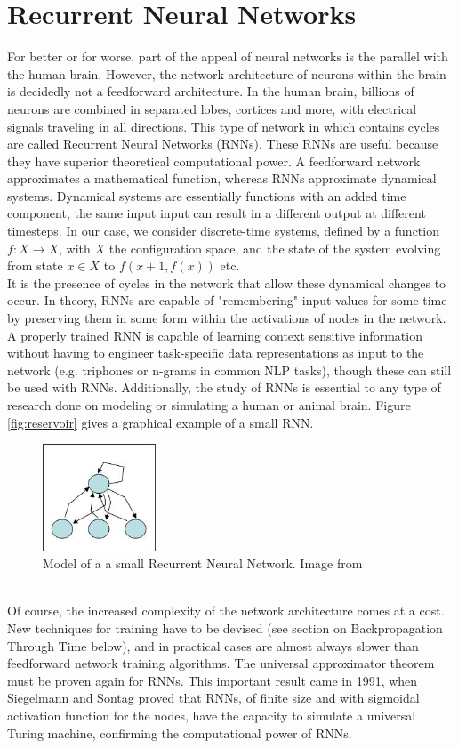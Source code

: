 \documentclass[12pt,oneside]{CUNY_CS_PhD}
\begin{document}
\section{Recurrent Neural Networks}
For better or for worse, part of the appeal of neural networks is the parallel with the human brain. However, the network architecture of neurons within the brain is decidedly not a feedforward architecture. In the human brain, billions of neurons are combined in separated lobes, cortices and more, with electrical signals traveling in all directions. This type of network in which contains cycles are called Recurrent Neural Networks (RNNs). These RNNs are useful because they have superior theoretical computational power. A feedforward network approximates a mathematical function, whereas RNNs approximate dynamical systems. Dynamical systems are essentially functions with an added time component, the same input input can result in a different output at different timesteps. In our case, we consider discrete-time systems, defined by a function $f: X \rightarrow X$, with $X$ the configuration space, and the state of the system evolving from state $x \in X$ to $f(x+1, f(x))$ etc. \\
It is the presence of cycles in the network that allow these dynamical changes to occur. In theory, RNNs are capable of "remembering" input values for some time by preserving them in some form within the activations of nodes in the network. A properly trained RNN is capable of learning context sensitive information without having to engineer task-specific data representations as input to the network (e.g. triphones or n-grams in common NLP tasks), though these can still be used with RNNs. Additionally, the study of RNNs is essential to any type of research done on modeling or simulating a human or animal brain. Figure \ref{fig:reservoir} gives a graphical example of a small RNN.
\begin{figure}[!htbp]
\centering
\includegraphics[width=0.3\textwidth]{pictures/rnn.png}
\caption{Model of a a small Recurrent Neural Network. Image from \cite{rnn} }
\label{fig:rnn}
\end{figure}\\
Of course, the increased complexity of the network architecture comes at a cost. New techniques for training have to be devised (see section on Backpropagation Through Time below), and in practical cases are almost always slower than feedforward network training algorithms. The universal approximator theorem must be proven again for RNNs. This important result came in 1991, when Siegelmann and Sontag \cite{Siegelmann91turingcomputability} proved that RNNs, of finite size and with sigmoidal activation function for the nodes, have the capacity to simulate a universal Turing machine, confirming the computational power of RNNs.
\end{document}
